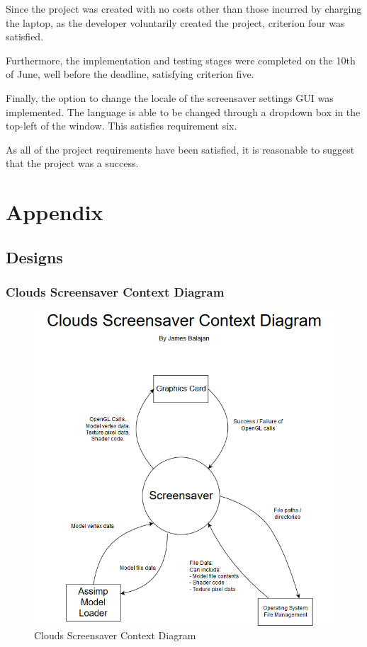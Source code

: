 \documentclass[10pt, openany]{book}
\begin{document}
Since the project was created with no costs other than those incurred by charging the laptop, as the developer voluntarily created the project, criterion four was satisfied.

Furthermore, the implementation and testing stages were completed on the 10th of June, well before the deadline, satisfying criterion five.

Finally, the option to change the locale of the screensaver settings GUI was implemented. The language is able to be changed through a dropdown box in the top-left of the window. This satisfies requirement six.

As all of the project requirements have been satisfied, it is reasonable to suggest that the project was a success.

\printbibliography[heading=bibintoc,title={Bibliography}]

\printglossaries

\chapter{Appendix}
\section{Designs}
\subsection{Clouds Screensaver Context Diagram}
\begin{figure}[H]
	\centering
	\includegraphics[width=0.9\linewidth]{Clouds Context Diagram}
	\caption{Clouds Screensaver Context Diagram}
	\label{app:clouds-context}
\end{figure}
\newpage
\end{document}
